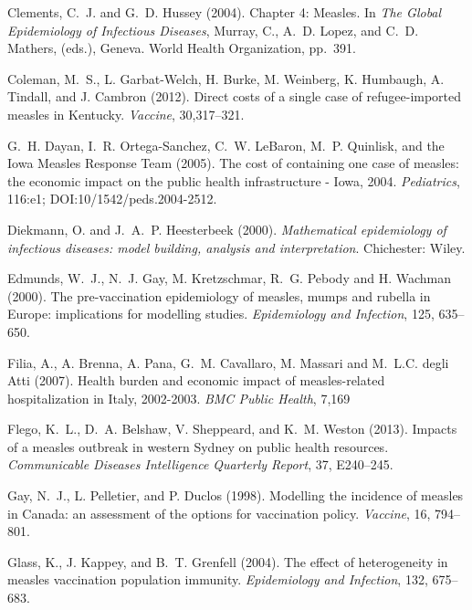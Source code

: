 \documentclass{article}
\begin{document}
\begin{thebibliography}{}
Clements, C.~J. and G.~D. Hussey (2004).
\newblock Chapter 4: Measles.
\newblock In \emph{The Global Epidemiology of Infectious Diseases},  Murray, C., A.~D. Lopez, and C.~D. Mathers, (eds.), Geneva.
  World Health Organization, pp.~391.

Coleman, M.~S., L. Garbat-Welch, H. Burke, M. Weinberg, K. Humbaugh, A. Tindall, and J. Cambron (2012).
\newblock Direct costs of a single case of refugee-imported measles in Kentucky.
\newblock \emph{Vaccine}, 30,317--321.

G.~H. Dayan, I.~R. Ortega-Sanchez, C.~W. LeBaron, M.~P. Quinlisk, and the Iowa Measles Response Team (2005).
\newblock The cost of containing one case of measles: the economic impact on the public health infrastructure - Iowa, 2004.
\newblock \emph{Pediatrics}, 116:e1; DOI:10/1542/peds.2004-2512.

Diekmann, O. and  J.~A.~P. Heesterbeek (2000).
\newblock \emph{Mathematical epidemiology of infectious diseases: model building, analysis and interpretation}.
Chichester: Wiley.

Edmunds, W.~J., N.~J. Gay, M. Kretzschmar, R.~G. Pebody and H. Wachman (2000).
\newblock The pre-vaccination epidemiology of measles, mumps and rubella in Europe: implications for modelling studies.
\newblock \emph{Epidemiology and Infection}, 125, 635--650.

Filia, A., A. Brenna, A. Pana, G.~M. Cavallaro, M. Massari and M.~L.C. degli Atti (2007).
\newblock Health burden and economic impact of measles-related hospitalization in Italy, 2002-2003.
\newblock \emph{BMC Public Health}, 7,169

Flego, K.~L., D.~A. Belshaw, V. Sheppeard, and K.~M. Weston (2013).
\newblock Impacts of a measles outbreak in western Sydney on public health resources.
\newblock \emph{Communicable Diseases Intelligence Quarterly Report}, 37, E240--245.

Gay, N.~J., L. Pelletier, and P. Duclos (1998).
\newblock Modelling the incidence of measles in Canada: an assessment of the options for vaccination policy.
\newblock \emph{Vaccine}, 16, 794--801.

Glass, K., J. Kappey, and B.~T. Grenfell (2004).
\newblock The effect of heterogeneity in measles vaccination population immunity.
\newblock \emph{Epidemiology and Infection}, 132, 675--683.


\end{thebibliography}
\end{document}
